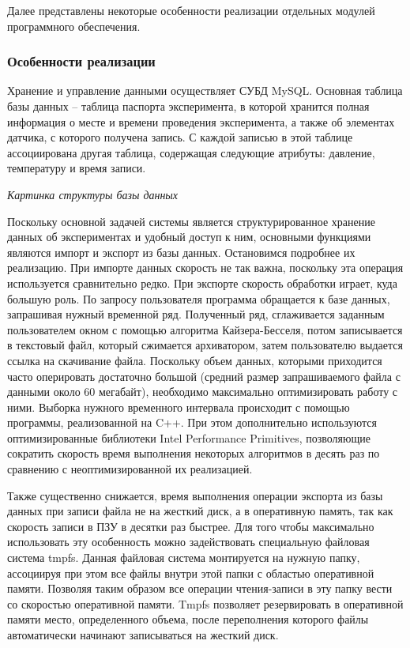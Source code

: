 Далее представлены некоторые особенности реализации отдельных модулей программного обеспечения.

\subsubsection{Особенности реализации}

Хранение и управление данными осуществляет СУБД MySQL. Основная таблица базы данных – таблица паспорта эксперимента, в которой хранится полная информация о месте и времени проведения эксперимента, а также об элементах датчика, с которого получена запись. С каждой записью в этой таблице ассоциирована другая таблица, содержащая следующие атрибуты: давление, температуру и время записи.

\emph{Картинка структуры базы данных}


Поскольку основной задачей системы является структурированное хранение данных об экспериментах и удобный доступ к ним, основными функциями являются импорт и экспорт из базы данных. Остановимся подробнее их реализацию. При импорте данных скорость не так важна, поскольку эта операция используется сравнительно редко. При экспорте скорость обработки играет, куда большую роль. По запросу пользователя программа обращается к базе данных, запрашивая нужный временной ряд. Полученный ряд, сглаживается заданным пользователем окном с помощью алгоритма Кайзера-Бесселя, потом записывается в текстовый файл, который сжимается архиватором, затем пользователю выдается ссылка на скачивание файла. Поскольку объем данных, которыми приходится часто оперировать достаточно большой (средний размер запрашиваемого файла с данными около 60 мегабайт), необходимо максимально оптимизировать работу с ними. Выборка нужного временного интервала происходит с помощью программы, реализованной на C++. При этом дополнительно используются оптимизированные библиотеки Intel Performance Primitives, позволяющие сократить скорость время выполнения некоторых алгоритмов в десять раз по сравнению с неоптимизированной их реализацией.

Также существенно снижается, время выполнения операции экспорта из базы данных при записи файла не на жесткий диск, а в оперативную память, так как скорость записи в ПЗУ в десятки раз быстрее. Для того чтобы максимально использовать эту особенность можно задействовать специальную файловая система tmpfs. Данная файловая система монтируется на нужную папку, ассоциируя при этом все файлы внутри этой папки с областью оперативной памяти. Позволяя таким образом все операции чтения-записи в эту папку вести со скоростью оперативной памяти. Tmpfs позволяет резервировать в оперативной памяти место, определенного объема, после переполнения которого файлы автоматически начинают записываться на жесткий диск.

